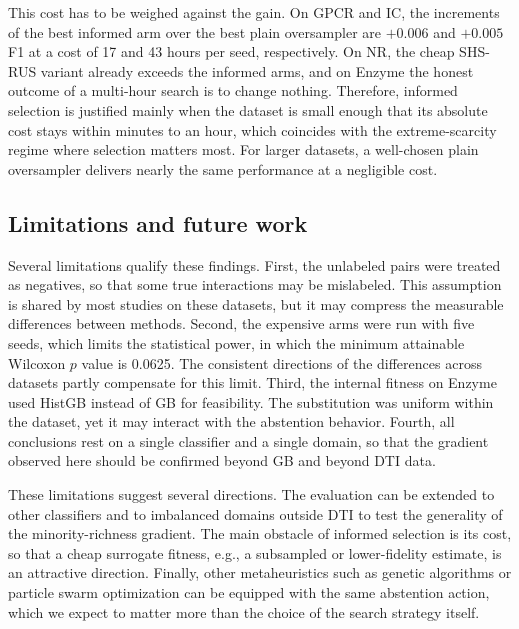 \documentclass[10pt,a4paper]{article}
\begin{document}
This cost has to be weighed against the gain. On GPCR and IC, the
increments of the best informed arm over the best plain oversampler are
$+0.006$ and $+0.005$ F1 at a cost of 17 and 43 hours per seed, respectively. On NR,
the cheap SHS-RUS variant already exceeds the informed arms, and on
Enzyme the honest outcome of a multi-hour search is to change nothing.
Therefore, informed selection is justified mainly when the dataset is
small enough that its absolute cost stays within minutes to an hour,
which coincides with the extreme-scarcity regime where selection matters
most. For larger datasets, a well-chosen plain oversampler delivers
nearly the same performance at a negligible cost.

\begin{table}[htbp]
\centering
\caption{The mean runtime per seed of the 13 methods, in which the
factor in parentheses denotes the ratio to the baseline of the same
dataset.}
\label{tab:runtime}
\end{table}

\subsection{Limitations and future work}
Several limitations qualify these findings. First, the unlabeled pairs
were treated as negatives, so that some true interactions may be
mislabeled. This assumption is shared by most studies on these datasets,
but it may compress the measurable differences between methods. Second,
the expensive arms were run with five seeds, which limits the
statistical power, in which the minimum attainable Wilcoxon $p$ value is
0.0625. The consistent directions of the differences across datasets
partly compensate for this limit. Third, the internal fitness on Enzyme
used HistGB instead of GB for feasibility. The substitution was uniform
within the dataset, yet it may interact with the abstention behavior.
Fourth, all conclusions rest on a single classifier and a single domain,
so that the gradient observed here should be confirmed beyond GB and
beyond DTI data.

These limitations suggest several directions. The evaluation can be
extended to other classifiers and to imbalanced domains outside DTI to
test the generality of the minority-richness gradient. The main obstacle
of informed selection is its cost, so that a cheap surrogate fitness,
e.g., a subsampled or lower-fidelity estimate, is an attractive
direction. Finally, other metaheuristics such as genetic algorithms or
particle swarm optimization can be equipped with the same abstention
action, which we expect to matter more than the choice of the search
strategy itself.
\end{document}
